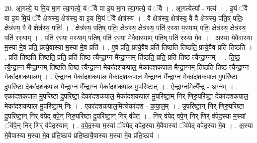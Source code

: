 \documentclass[17pt]{extarticle}
\begin{document}
20. आ॒गत्ये॒ य मि॒य मा॒ग त्या॒गत्ये॒ यं ॅवै वा इ॒य मा॒ग त्या॒गत्ये॒ यं ॅवै । . आ॒गत्येत्या᳚ - गत्य॑ । . इ॒यं ॅवै वा इ॒य मि॒यं ॅवै क्षेत्र॑स्य॒ क्षेत्र॑स्य॒ वा इ॒य मि॒यं ॅवै क्षेत्र॑स्य । . वै क्षेत्र॑स्य॒ क्षेत्र॑स्य॒ वै वै क्षेत्र॑स्य॒ पति॒ष् पतिः॒ क्षेत्र॑स्य॒ वै वै क्षेत्र॑स्य॒ पतिः॑ । . क्षेत्र॑स्य॒ पति॒ष् पतिः॒ क्षेत्र॑स्य॒ क्षेत्र॑स्य॒ पति॑ र॒स्या म॒स्याम् पतिः॒ क्षेत्र॑स्य॒ क्षेत्र॑स्य॒ पति॑ र॒स्याम् । . पति॑ र॒स्या म॒स्याम् पति॒ष् पति॑ र॒स्या मे॒वैवास्याम् पति॒ष् पति॑ र॒स्या मे॒व । . अ॒स्या मे॒वैवास्या म॒स्या मे॒व प्रति॒ प्रत्ये॒वास्या म॒स्या मे॒व प्रति॑ । . ए॒व प्रति॒ प्रत्ये॒वैव प्रति॑ तिष्ठति तिष्ठति॒ प्रत्ये॒वैव प्रति॑ तिष्ठति । . प्रति॑ तिष्ठति तिष्ठति॒ प्रति॒ प्रति॑ तिष्ठ त्यैन्द्रा॒ग्न मै᳚न्द्रा॒ग्नम् ति॑ष्ठति॒ प्रति॒ प्रति॑ तिष्ठ त्यैन्द्रा॒ग्नम् । . ति॒ष्ठ॒ त्यै॒न्द्रा॒ग्न मै᳚न्द्रा॒ग्नम् ति॑ष्ठति तिष्ठ त्यैन्द्रा॒ग्न मेका॑दशकपाल॒ मेका॑दशकपाल मैन्द्रा॒ग्नम् ति॑ष्ठति तिष्ठ त्यैन्द्रा॒ग्न मेका॑दशकपालम् । . ऐ॒न्द्रा॒ग्न मेका॑दशकपाल॒ मेका॑दशकपाल मैन्द्रा॒ग्न मै᳚न्द्रा॒ग्न मेका॑दशकपाल मु॒परि॑ष्टा दु॒परि॑ष्टा॒ देका॑दशकपाल मैन्द्रा॒ग्न मै᳚न्द्रा॒ग्न मेका॑दशकपाल मु॒परि॑ष्टात् । . ऐ॒न्द्रा॒ग्नमित्यै᳚न्द्र - अ॒ग्नम् । . एका॑दशकपाल मु॒परि॑ष्टा दु॒परि॑ष्टा॒ देका॑दशकपाल॒ मेका॑दशकपाल 
मु॒परि॑ष्टा॒म् निर् णिरु॒परि॑ष्टा॒ देका॑दशकपाल॒ मेका॑दशकपाल मु॒परि॑ष्टा॒म् निः । . एका॑दशकपाल॒मित्येका॑दश - क॒पा॒ल॒म् । . उ॒परि॑ष्टा॒न् निर् णिरु॒परि॑ष्टा दु॒परि॑ष्टा॒न् निर् व॑पेद् वपे॒न् निरु॒परि॑ष्टा दु॒परि॑ष्टा॒न् निर् व॑पेत् । . निर् व॑पेद् वपे॒न् निर् णिर् व॑पेद॒स्या म॒स्यां ॅव॑पे॒न् निर् णिर् व॑पेद॒स्याम् । . व॒पे॒द॒स्या म॒स्यां ॅव॑पेद् वपेद॒स्या मे॒वैवास्यां ॅव॑पेद् वपेद॒स्या मे॒व । . अ॒स्या मे॒वैवास्या म॒स्या मे॒व प्र॑ति॒ष्ठाय॑ प्रति॒ष्ठायै॒वास्या म॒स्या मे॒व प्र॑ति॒ष्ठाय॑ । \newline
\end{document}
